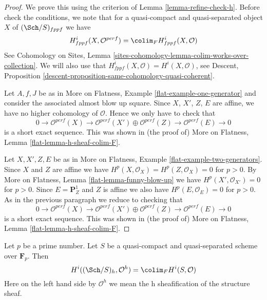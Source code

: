 \begin{proof}
We prove this using the criterion of Lemma \ref{lemma-refine-check-h}.
Before check the conditions, we note that for a
quasi-compact and quasi-separated object $X$ of
$(\Sch/S)_{fppf}$ we have
$$
H^i_{fppf}(X, \mathcal{O}^{perf}) = \colim_F H^i_{fppf}(X, \mathcal{O})
$$
See Cohomology on Sites,
Lemma \ref{sites-cohomology-lemma-colim-works-over-collection}.
We will also use that $H^i_{fppf}(X, \mathcal{O}) = H^i(X, \mathcal{O})$, see
Descent, Proposition \ref{descent-proposition-same-cohomology-quasi-coherent}.

\medskip\noindent
Let $A, f, J$ be as in
More on Flatness, Example \ref{flat-example-one-generator}
and consider the associated almost blow up square.
Since $X$, $X'$, $Z$, $E$ are affine, we have no
higher cohomology of $\mathcal{O}$. Hence we only
have to check that
$$
0 \to
\mathcal{O}^{perf}(X) \to
\mathcal{O}^{perf}(X') \oplus \mathcal{O}^{perf}(Z) \to
\mathcal{O}^{perf}(E) \to 0
$$
is a short exact sequence. This was shown in (the proof of)
More on Flatness, Lemma \ref{flat-lemma-h-sheaf-colim-F}.

\medskip\noindent
Let $X, X', Z, E$ be as in
More on Flatness, Example \ref{flat-example-two-generators}.
Since $X$ and $Z$ are affine we have
$H^p(X, \mathcal{O}_X) = H^p(Z, \mathcal{O}_X) = 0$ for $p > 0$.
By More on Flatness, Lemma \ref{flat-lemma-funny-blow-up}
we have $H^p(X', \mathcal{O}_{X'}) = 0$ for $p > 0$.
Since $E = \mathbf{P}^1_Z$ and $Z$ is affine we also have
$H^p(E, \mathcal{O}_E) = 0$ for $p > 0$. As in the previous
paragraph we reduce to checking that
$$
0 \to
\mathcal{O}^{perf}(X) \to
\mathcal{O}^{perf}(X') \oplus \mathcal{O}^{perf}(Z) \to
\mathcal{O}^{perf}(E) \to 0
$$
is a short exact sequence. This was shown in (the proof of)
More on Flatness, Lemma \ref{flat-lemma-h-sheaf-colim-F}.
\end{proof}

\begin{proposition}
\label{proposition-h-cohomology-structure-sheaf}
Let $p$ be a prime number. Let $S$ be a quasi-compact and quasi-separated
scheme over $\mathbf{F}_p$. Then
$$
H^i((\Sch/S)_h, \mathcal{O}^h) =
\colim_F H^i(S, \mathcal{O})
$$
Here on the left hand side by $\mathcal{O}^h$ we mean
the h sheafification of the structure sheaf.
\end{proposition}

